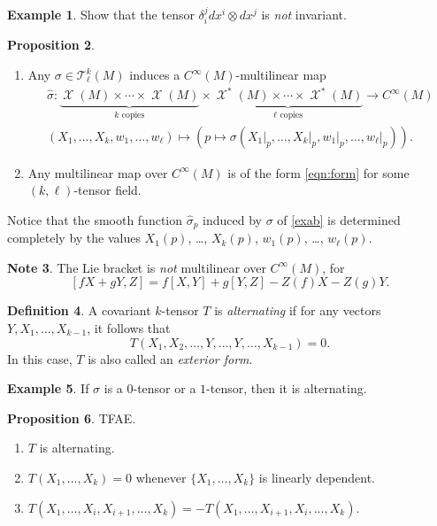 \documentclass[10pt,letterpaper,cm]{nupset}
\theoremstyle{definition}
\newtheorem{definition}{Definition}[subsection]
\newtheorem{exmp}[definition]{Example}
\newtheorem{note}[definition]{Note}
\theoremstyle{theorem}
\newtheorem{prop}[definition]{Proposition}
\theoremstyle{remark}
\newcommand{\T}{\mathcal T}
\newcommand{\1}{\mathbf{1}}
\newcommand{\0}{\vec 0}
\DeclareMathOperator{\vf}{\mathscr{X}}
\begin{document}
\begin{exmp}
Show that the tensor $\delta_i^j dx^i \otimes dx^j$ is \emph{not} invariant. 
\end{exmp}

\begin{prop} $ $
\begin{enumerate}
\item Any $ \sigma \in \T_{\ell}^k(M)$ induces a $C^{\infty}(M)$-multilinear map 
\begin{gather*}
\hat{\sigma} : \underbrace{\vf(M) \times \cdots \times \vf(M)}_{k \text{ copies}} \times \underbrace{\vf^{\ast}(M) \times \cdots \times \vf^{\ast}(M)}_{\ell \text{ copies}}\longrightarrow C^{\infty}(M)
\label{eqn:form} \\ \left(X_1, \ldots, X_k, w_1, \ldots, w_{\ell}\right)\mapsto \left(p \mapsto \sigma \left(X_1\bigr\rvert_p, \ldots, X_k\bigr\rvert_p, w_1\bigr\rvert_p, \ldots, w_{\ell}\bigr\rvert_p\right)\right). \tag{$\ast$}
\end{gather*}
\item Any multilinear map over $C^{\infty}(M)$ is of the form \eqref{eqn:form} for some $(k, \ell)$-tensor field.
\end{enumerate}
\end{prop}

Notice that the smooth function $\hat{\sigma}_p$ induced by $\sigma$ of \cref{exab} is determined completely by  the values $X_1(p)$, \ldots, $X_k(p)$, $w_1(p)$, \ldots, $w_{\ell}(p)$.

\medskip

\begin{note}
The Lie bracket is \emph{not} multilinear over $C^{\infty}(M)$, for $$[fX + gY, Z] = f[X, Y] + g[Y, Z]-Z(f)X -Z(g)Y.$$
\end{note}

\medskip


\begin{definition}
A covariant $k$-tensor $T$ is \textit{alternating}  if for any vectors $Y, X_1, \ldots, X_{k-1}$, it follows that $$T(X_1, X_2, \ldots, Y, \ldots, Y, \ldots, X_{k-1}) =0.$$ In this case, $T$ is also called an \textit{exterior form}.
\end{definition}

\begin{exmp}
If $\sigma$ is a $0$-tensor or a $1$-tensor, then it is alternating.
\end{exmp}

\begin{prop} TFAE.
\begin{enumerate}
\item $T$ is alternating.
\item $T(X_1, \ldots, X_k) =0$ whenever $\{X_1, \ldots,  X_k\}$ is linearly dependent.
\item $T(X_1, \ldots, X_i, X_{i+1}, \ldots, X_k) = {-T(X_1, \ldots, X_{i+1}, X_{i}, \ldots, X_k)}$.
\end{enumerate}
\end{prop}
\end{document}

